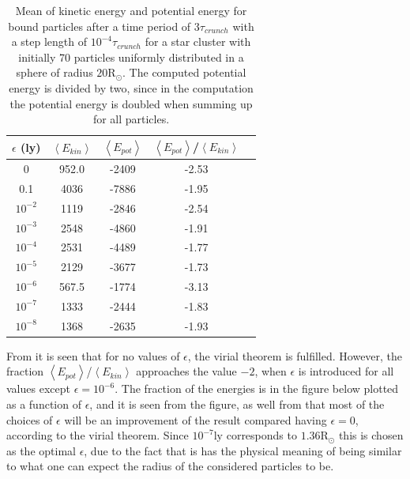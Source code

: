 \begin{table}[H]
\centering
\begin{tabular}{|c|c|c|c|c|}
\hline
$\epsilon$ (ly)  & $\left< E_{kin} \right>$ & $\left< E_{pot} \right>$ & $\left< E_{pot} \right>$/$\left< E_{kin} \right>$ \\
\hline
0 & 952.0 & -2409 & -2.53	
\\ \hline
0.1 & 4036 & -7886 & -1.95
\\ \hline
$10^{-2}$ & 1119 & -2846 & -2.54
\\ \hline
$10^{-3}$ & 2548 & -4860 & -1.91
\\ \hline
$10^{-4}$ & 2531 & -4489 & -1.77
\\ \hline
$10^{-5}$ & 2129 & -3677 & -1.73
\\ \hline
$10^{-6}$ & 567.5 & -1774 & -3.13
\\ \hline
$10^{-7}$ & 1333 & -2444 & -1.83
\\ \hline
$10^{-8}$ & 1368 & -2635 & -1.93
\\ \hline
\end{tabular}
\caption{
Mean of kinetic energy and potential energy for bound particles after a time period of $3\tau_{crunch}$ with a step length of $10^{-4} \tau_{crunch}$ for a star cluster with initially 70 particles uniformly distributed in a sphere of radius $20\text{R}_{\odot}$.
The computed potential energy is divided by two, since in the computation the potential energy is doubled when summing up for all particles. 
}
\label{tab:DistributionPotKinEnBound}
\end{table}
From  it is seen that for no values of $\epsilon$, the virial theorem is fulfilled. 
However, the fraction $\left< E_{pot} \right>$/$\left< E_{kin} \right>$ approaches the value $-2$, when $\epsilon$ is introduced for all values except $\epsilon = 10^{-6}$.
The fraction of the energies is in the figure below plotted as a function of $\epsilon$, and it is seen from the figure, as well from  that most of the choices of $\epsilon$ will be an improvement of the result compared having $\epsilon = 0$, according to the virial theorem.
Since $10^{-7} \text{ly}$ corresponds to $1.36\text{R}_{\odot}$ this is chosen as the optimal $\epsilon$, due to the fact that is has the physical meaning of being similar to what one can expect the radius of the considered particles to be.
